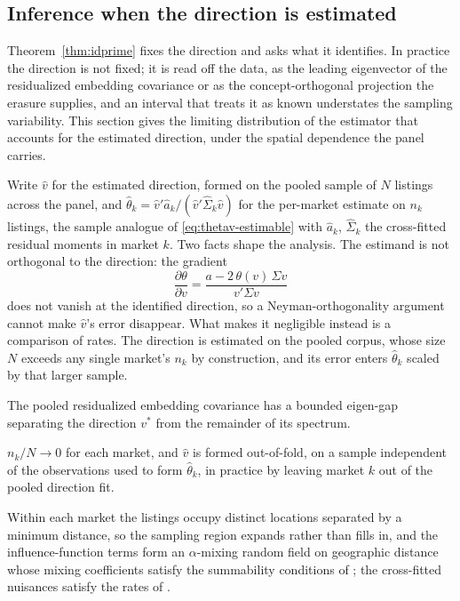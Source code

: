 \subsection{Inference when the direction is estimated}
\label{sec:estimated-direction-inference}

Theorem~\ref{thm:idprime} fixes the direction and asks what it identifies. In
practice the direction is not fixed; it is read off the data, as the leading
eigenvector of the residualized embedding covariance or as the concept-orthogonal
projection the erasure supplies, and an interval that treats it as known understates
the sampling variability. This section gives the limiting distribution of the
estimator that accounts for the estimated direction, under the spatial dependence the
panel carries.

Write $\hat v$ for the estimated direction, formed on the pooled sample of $N$
listings across the panel, and $\hat\theta_k=\hat v'\hat a_k/(\hat v'\hat\Sigma_k\hat
v)$ for the per-market estimate on $n_k$ listings, the sample analogue of
\eqref{eq:thetav-estimable} with $\hat a_k$, $\hat\Sigma_k$ the cross-fitted residual
moments in market $k$. Two facts shape the analysis. The estimand is not orthogonal to
the direction: the gradient
\[
\frac{\partial\theta}{\partial v}=\frac{a-2\,\theta(v)\,\Sigma v}{v'\Sigma v}
\]
does not vanish at the identified direction, so a Neyman-orthogonality argument cannot
make $\hat v$'s error disappear. What makes it negligible instead is a comparison of
rates. The direction is estimated on the pooled corpus, whose size $N$ exceeds any
single market's $n_k$ by construction, and its error enters $\hat\theta_k$ scaled by
that larger sample.

\begin{assumption}\label{as:ed-gap}
The pooled residualized embedding covariance has a bounded eigen-gap separating the
direction $v^\ast$ from the remainder of its spectrum.
\end{assumption}
\begin{assumption}\label{as:ed-rate}
$n_k/N\to0$ for each market, and $\hat v$ is formed out-of-fold, on a sample
independent of the observations used to form $\hat\theta_k$, in practice by leaving
market $k$ out of the pooled direction fit.
\end{assumption}
\begin{assumption}\label{as:ed-spatial}
Within each market the listings occupy distinct locations separated by a minimum
distance, so the sampling region expands rather than fills in, and the
influence-function terms form an $\alpha$-mixing random field on geographic distance
whose mixing coefficients satisfy the summability conditions of
\citet{jenish2009central}; the cross-fitted nuisances satisfy the rates of
\citet{chernozhukov2018double}.
\end{assumption}

